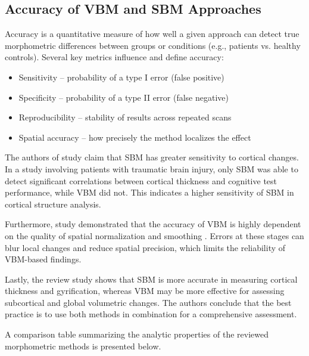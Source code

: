\documentclass[default]{subfiles}
\begin{document}
\subsection{Accuracy of VBM and SBM Approaches}

Accuracy is a quantitative measure of how well a given approach can detect true morphometric differences between groups
or conditions (e.g., patients vs. healthy controls).
Several key metrics influence and define accuracy:\newline

\begin{itemize}
    \item Sensitivity – probability of a type I error (false positive)
    \item Specificity – probability of a type II error (false negative)
    \item Reproducibility – stability of results across repeated scans
    \item Spatial accuracy – how precisely the method localizes the effect\newline
\end{itemize}

The authors of study \cite{upadhyay_2014} claim that SBM has greater sensitivity to cortical changes. In a study
involving patients with traumatic brain injury, only SBM was able to detect significant correlations between cortical
thickness and cognitive test performance, while VBM did not. This indicates a higher sensitivity of SBM in cortical
structure analysis.

Furthermore, study \cite{friston_2004} demonstrated that the accuracy of VBM is highly dependent on the quality of
spatial normalization and smoothing \cite{han_2006}. Errors at these stages can blur local changes and reduce spatial
precision, which limits the reliability of VBM-based findings.

Lastly, the review study \cite{goto_2022} shows that SBM is more accurate in measuring cortical thickness and
gyrification, whereas VBM may be more effective for assessing subcortical and global volumetric changes. The authors
conclude that the best practice is to use both methods in combination for a comprehensive assessment.

A comparison table summarizing the analytic properties of the reviewed morphometric methods is presented below.
\end{document}
